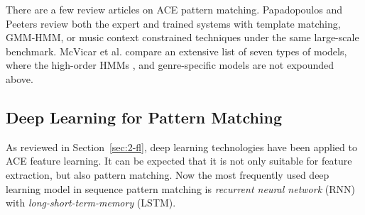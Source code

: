 There are a few review articles on ACE pattern matching. Papadopoulos and Peeters \cite{papadopoulos2007large} review both the expert and trained systems with template matching, GMM-HMM, or music context constrained techniques under the same large-scale benchmark. McVicar et al. \cite{mcvicar2014automatic} compare an extensive list of seven types of models, where the high-order HMMs \cite{scholz2009robust,mauch2007discovering,khadkevich2009use,yoshii2011vocabulary}, and genre-specific models \cite{lee2008acoustic,lee2007system} are not expounded above.

\subsection{Deep Learning for Pattern Matching} \label{sec:2-rnnpm}
As reviewed in Section~\ref{sec:2-fl}, deep learning technologies have been applied to ACE feature learning. It can be expected that it is not only suitable for feature extraction, but also pattern matching. Now the most frequently used deep learning model in sequence pattern matching is {\it recurrent neural network} (RNN) with {\it long-short-term-memory} (LSTM).

